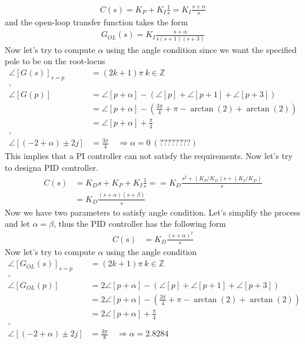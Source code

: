 \documentclass[twoside]{article}
\begin{document}
%
\begin{align*}
 C(s) = K_P + K_I \frac{1}{s} = K_I \frac{s + \alpha}{s}
\end{align*}
% 
and the open-loop transfer function takes the form
%
\begin{align*}
  G_{OL}(s) = K_I \frac{s + \alpha}{s (s+1) (s+3)}
\end{align*}
%
Now let's try to compute $\alpha$ using the angle condition
since we want the specified pole to be on the root-locus
%
\begin{align*}
  \angle [ G(s) ]_{s=p} &= (2 k + 1) \pi \ k \in \mathbb{Z}
\\
,
\\
  \angle [ G(p) ] &= \angle [ p + \alpha ] - \left( \angle [ p ] +
  \angle [ p + 1 ] + \angle [ p +  3] \right) 
\\
&= \angle [ p + \alpha ]  - \left( \frac{3 \pi}{4} + \pi - \arctan(2)
  + \arctan(2) \right) 
\\
&= \angle [ p + \alpha ]  + \frac{\pi}{4} 
\\
,
\\
\angle [ (-2 + \alpha) \pm 2 j ] &= \frac{3 \pi}{4} \quad \Rightarrow
                                   \alpha = 0 \ (????????)
\end{align*}
% 
This implies that a PI controller can not satisfy the requirements.
Now let's try to designa PID controller. 
%
\begin{align*}
 C(s) &= K_D s + K_P + K_I \frac{1}{s} = 
= K_D  \frac{ s^2 +   (K_P/K_D) s  + (K_I/K_D)  }{s}
\\
&= K_D \frac{ (s+\alpha) (s + \beta) }{s}
\end{align*}
%
Now we have two parameters to satisfy angle condition. Let's simplify
the process and let $\alpha = \beta$, thus the PID controller has the
following form
%
\begin{align*}
 C(s) 
&= K_D \frac{(s+\alpha)^2}{s}
\end{align*}
%
Now let's try to compute $\alpha$ using the angle condition
%
\begin{align*}
  \angle [ G_{OL}(s) ]_{s=p} &= (2 k + 1) \pi \ k \in \mathbb{Z}
\\
,
\\
  \angle [ G_{OL}(p) ] &= 2 \angle [ p + \alpha ] - \left( \angle [ p ] +
  \angle [ p + 1 ] + \angle [ p +  3] \right) 
\\
&= 2 \angle [ p + \alpha ]  - \left( \frac{3 \pi}{4} + \pi - \arctan(2)
  + \arctan(2) \right) 
\\
&= 2 \angle [ p + \alpha ]  + \frac{\pi}{4} 
\\
,
\\
\angle [ (-2 + \alpha) \pm 2 j ] &= \frac{3 \pi}{8} \quad \Rightarrow
                                   \alpha = 2.8284 
\end{align*}
\end{document}
